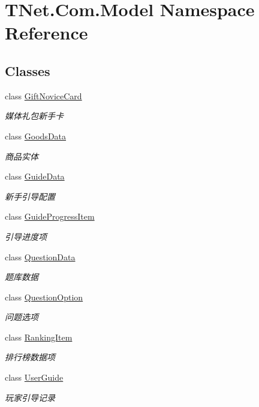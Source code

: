 \hypertarget{namespace_t_net_1_1_com_1_1_model}{}\section{T\+Net.\+Com.\+Model Namespace Reference}
\label{namespace_t_net_1_1_com_1_1_model}
\subsection*{Classes}
\begin{DoxyCompactItemize}
\item 
class \mbox{\hyperlink{class_t_net_1_1_com_1_1_model_1_1_gift_novice_card}{Gift\+Novice\+Card}}
\begin{DoxyCompactList}\small\item\em 媒体礼包新手卡 \end{DoxyCompactList}\item 
class \mbox{\hyperlink{class_t_net_1_1_com_1_1_model_1_1_goods_data}{Goods\+Data}}
\begin{DoxyCompactList}\small\item\em 商品实体 \end{DoxyCompactList}\item 
class \mbox{\hyperlink{class_t_net_1_1_com_1_1_model_1_1_guide_data}{Guide\+Data}}
\begin{DoxyCompactList}\small\item\em 新手引导配置 \end{DoxyCompactList}\item 
class \mbox{\hyperlink{class_t_net_1_1_com_1_1_model_1_1_guide_progress_item}{Guide\+Progress\+Item}}
\begin{DoxyCompactList}\small\item\em 引导进度项 \end{DoxyCompactList}\item 
class \mbox{\hyperlink{class_t_net_1_1_com_1_1_model_1_1_question_data}{Question\+Data}}
\begin{DoxyCompactList}\small\item\em 题库数据 \end{DoxyCompactList}\item 
class \mbox{\hyperlink{class_t_net_1_1_com_1_1_model_1_1_question_option}{Question\+Option}}
\begin{DoxyCompactList}\small\item\em 问题选项 \end{DoxyCompactList}\item 
class \mbox{\hyperlink{class_t_net_1_1_com_1_1_model_1_1_ranking_item}{Ranking\+Item}}
\begin{DoxyCompactList}\small\item\em 排行榜数据项 \end{DoxyCompactList}\item 
class \mbox{\hyperlink{class_t_net_1_1_com_1_1_model_1_1_user_guide}{User\+Guide}}
\begin{DoxyCompactList}\small\item\em 玩家引导记录 \end{DoxyCompactList}\end{DoxyCompactItemize}
